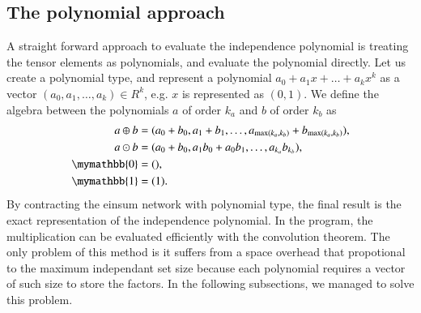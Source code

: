 \documentclass[review,onefignum,onetabnum]{siamart190516}
\newcommand{\<}{\langle}
\renewcommand{\>}{\rangle}
\begin{document}
\subsection{The polynomial approach}
A straight forward approach to evaluate the independence polynomial is treating the tensor elements as polynomials, and evaluate the polynomial directly.
Let us create a polynomial type, and represent a polynomial $a_0 + a_1 x + \ldots + a_k x^k$ as a vector $(a_0, a_1, \ldots, a_k) \in R^k$, e.g. $x$ is represented as $(0, 1)$.
We define the algebra between the polynomials $a$ of order $k_a$ and $b$ of order $k_b$ as
\begin{align}
    \begin{split}
    a \oplus b &= (a_0 + b_0, a_1 + b_1, \ldots, a_{\max(k_a, k_b)} + b_{\max(k_a, k_b)}),\\
    a \odot b &= (a_0 + b_0, a_1b_0 + a_0b_1, \ldots, a_{k_a} b_{k_b}),\\
    \mymathbb{0} &= (),\\
    \mymathbb{1} &= (1).\label{eq:polynomial}
    \end{split}
\end{align}
By contracting the einsum network with polynomial type, the final result is the exact representation of the independence polynomial.
In the program, the multiplication can be evaluated efficiently with the convolution theorem.
The only problem of this method is it suffers from a space overhead that propotional to the maximum independant set size because each polynomial requires a vector of such size to store the factors.
In the following subsections, we managed to solve this problem.
\end{document}
